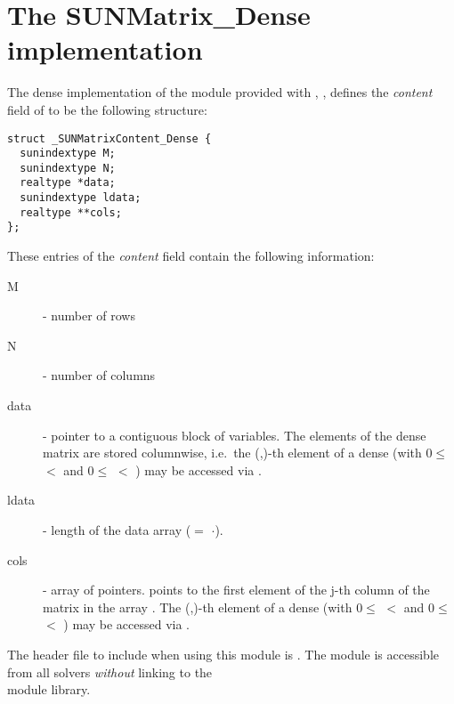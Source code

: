 \section{The SUNMatrix\_Dense implementation}\label{ss:sunmat_dense}

The dense implementation of the {\sunmatrix} module provided with
{\sundials}, {\sunmatdense}, defines the {\em content} field
of  to be the following structure:
\begin{verbatim} 
struct _SUNMatrixContent_Dense {
  sunindextype M;
  sunindextype N;
  realtype *data;
  sunindextype ldata;
  realtype **cols;
};
\end{verbatim}
These entries of the \emph{content} field contain the following
information:
\begin{description}
  \item[M] - number of rows
  \item[N] - number of columns
  \item[data] - pointer to a contiguous block of  variables.
    The elements of the dense matrix are stored columnwise, i.e.~the
    (,)-th element of a dense {\sunmatrix}  
    (with $0 \le$  $<$  and $ 0 \le$  $<$ ) 
    may be accessed via .
  \item[ldata] - length of the data array ($=$ $\cdot$).
  \item[cols] - array of pointers.  points to the first
    element of the j-th column of the matrix in the array .
    The (,)-th element of a dense {\sunmatrix} 
    (with $0 \le$  $<$  and $ 0 \le$  $<$ ) 
    may be accessed via .
\end{description}

\noindent The header file to include when using this module 
is . The {\sunmatdense} module
is accessible from all {\sundials} solvers \textit{without}
linking to the \\
 module library. \\


